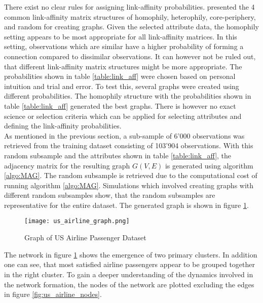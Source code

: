   \noindent There exist no clear rules for assigning link-affinity
  probabilities. \citeauthor{kim2012multiplicative} 
  \citeyearpar[p. 118]{kim2012multiplicative} presented the 4 common 
  link-affinity matrix structures of homophily, heterophily, core-periphery, and 
  random for creating graphs. Given the selected attribute data, the homophily 
  setting appears to be most appropriate for all link-affinity matrices. In this 
  setting, observations which are similar have a higher probability of forming a 
  connection compared to dissimilar observations. It can however not be ruled out, 
  that different link-affinity matrix structures might be more appropriate. The 
  probabilities shown in table \ref{table:link_aff} were chosen based on 
  personal intuition and trial and error. To test this, several graphs were 
  created using different probabilities. The homophily structure with the 
  probabilities shown in table \ref{table:link_aff} generated the best 
  graphs. There is however no exact science or selection criteria which can be 
  applied for selecting attributes and defining the link-affinity probabilities. \\

  \noindent As mentioned in the previous section, a sub-sample of 6'000 
  observations was retrieved from the training dataset consisting of 103’904 
  observations. With this random subsample and the attributes shown in table
  \ref{table:link_aff}, the adjacency matrix for the resulting graph $G(V,E)$ 
  is generated using algorithm \ref{algo:MAG}. The random subsample is 
  retrieved due to the computational cost of running algorithm \ref{algo:MAG}. 
  Simulations which involved creating graphs with different random subsamples 
  show, that the random subsamples are representative for the entire dataset. 
  The generated graph is shown in figure \ref{fig:us_airline_graph}.

  \begin{figure}[h]
	  \centering
	  \texttt{[image: us\_airline\_graph.png]}
	  \caption{Graph of US Airline Passenger Dataset}
      \label{fig:us_airline_graph}
  \end{figure}
  
  \noindent The network in figure \ref{fig:us_airline_graph} shows the 
  emergence of two primary clusters. In addition one can see, that most satisfied 
  airline passengers appear to be grouped together in the right cluster. To 
  gain a deeper understanding of the dynamics involved in the network formation, 
  the nodes of the network are plotted excluding the edges in figure
  \ref{fig:us_airline_nodes}.

